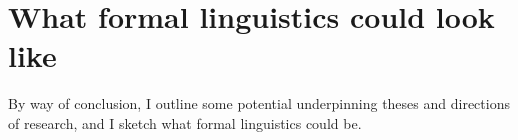



\maketitle%

\tableofcontents{}


\chapter{What formal linguistics could look like}
By way of conclusion, I outline some potential underpinning theses and directions of research, and I sketch what formal linguistics could be.
\newpage
\label{sec:metaphor}










